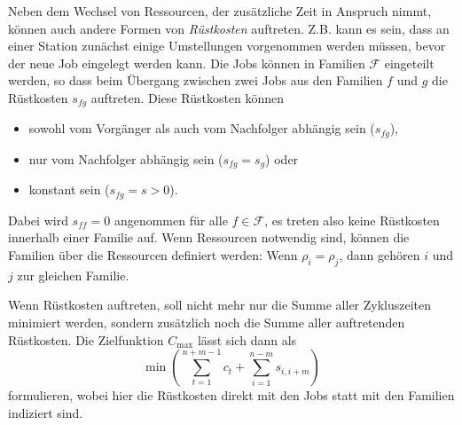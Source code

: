 \documentclass{scrreprt}
\begin{document}
Neben dem Wechsel von Ressourcen, der zusätzliche Zeit in Anspruch nimmt, können auch andere Formen von \textit{Rüstkosten}
auftreten. Z.B. kann es sein, dass an einer Station zunächst einige Umstellungen vorgenommen werden müssen, bevor der
neue Job eingelegt werden kann. Die Jobs können in Familien $\mathcal{F}$ eingeteilt werden, so dass beim Übergang
zwischen zwei Jobs aus den Familien $f$ und $g$ die Rüstkosten $s_{fg}$ auftreten.
Diese Rüstkosten können 
\begin{itemize}
    \item sowohl vom Vorgänger als auch vom Nachfolger abhängig sein ($s_{fg}$), 
    \item nur vom Nachfolger abhängig sein ($s_{fg} = s_{g}$) oder
    \item konstant sein ($s_{fg} = s > 0$).
\end{itemize}%
Dabei wird $s_{ff} = 0$ angenommen für alle $f\in\mathcal{F}$, es treten also keine Rüstkosten innerhalb einer Familie auf.
Wenn Ressourcen notwendig sind, können die Familien über die Ressourcen definiert werden:
Wenn $\rho_i=\rho_j$, dann gehören $i$ und $j$ zur gleichen Familie.

Wenn Rüstkosten auftreten, soll nicht mehr nur die Summe aller Zykluszeiten minimiert werden, sondern zusätzlich noch die Summe aller auftretenden Rüstkosten.
Die Zielfunktion $C_{\max}$ lässt sich dann als 
\[ \min\left(\sum_{t=1}^{n+m-1}c_t +\sum_{i=1}^{n-m}s_{i,i+m}\right) \] 
formulieren, wobei hier die Rüstkosten direkt mit den Jobs statt mit den Familien indiziert sind.
\end{document}
